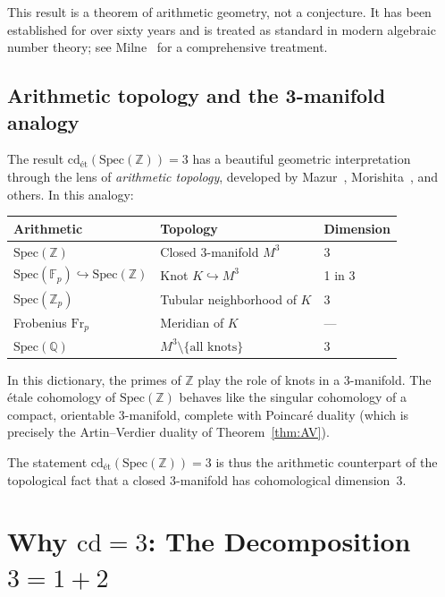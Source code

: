\documentclass[12pt,a4paper]{article}
\theoremstyle{definition}
\newcommand{\Spec}{\mathrm{Spec}}
\newcommand{\cd}{\mathrm{cd}}
\newcommand{\ZZ}{\mathbb{Z}}
\newcommand{\QQ}{\mathbb{Q}}
\newcommand{\FF}{\mathbb{F}}
\begin{document}
This result is a theorem of arithmetic geometry, not a conjecture. It has been
established for over sixty years and is treated as standard in modern algebraic number
theory; see Milne~\cite{Milne2006} for a comprehensive treatment.

\subsection{Arithmetic topology and the 3-manifold analogy}

The result $\cd_{\text{\'et}}(\Spec(\ZZ)) = 3$ has a beautiful geometric
interpretation through the lens of \emph{arithmetic topology}, developed by
Mazur~\cite{Mazur1964}, Morishita~\cite{Morishita2012}, and others. In this analogy:

\begin{center}
\begin{tabular}{lll}
\toprule
\textbf{Arithmetic} & \textbf{Topology} & \textbf{Dimension} \\
\midrule
$\Spec(\ZZ)$ & Closed 3-manifold $M^3$ & 3 \\
$\Spec(\FF_p) \hookrightarrow \Spec(\ZZ)$ & Knot $K \hookrightarrow M^3$ & 1 in 3 \\
$\Spec(\ZZ_p)$ & Tubular neighborhood of $K$ & 3 \\
Frobenius $\mathrm{Fr}_p$ & Meridian of $K$ & --- \\
$\Spec(\QQ)$ & $M^3 \setminus \{\text{all knots}\}$ & 3 \\
\bottomrule
\end{tabular}
\end{center}

In this dictionary, the primes of $\ZZ$ play the role of knots in a 3-manifold.
The \'etale cohomology of $\Spec(\ZZ)$ behaves like the singular cohomology of a
compact, orientable 3-manifold, complete with Poincar\'e duality (which is precisely
the Artin--Verdier duality of Theorem~\ref{thm:AV}).

The statement $\cd_{\text{\'et}}(\Spec(\ZZ)) = 3$ is thus the arithmetic counterpart
of the topological fact that a closed 3-manifold has cohomological dimension~3.

\section{Why $\cd = 3$: The Decomposition $3 = 1 + 2$}\label{sec:decomposition}
\end{document}

